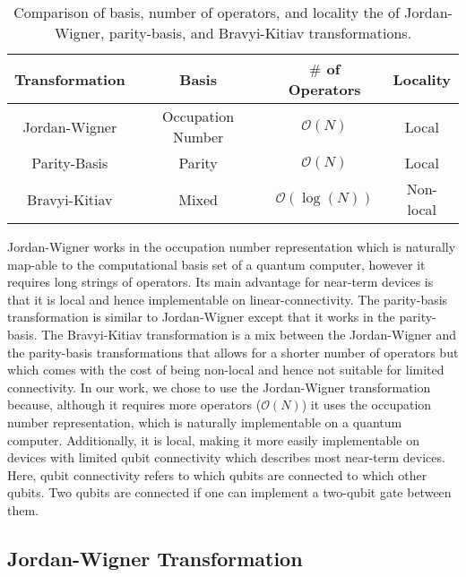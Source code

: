 \documentclass[10pt]{article}
\begin{document}
\begin{table}[h]
    \centering
    \begin{tabular}{c|c|c|c}
        Transformation & Basis & $\#$ of Operators & Locality \\
        \hline
        \hline
        Jordan-Wigner & Occupation Number & $\mathcal{O}(N)$ & Local \\
        \hline
        Parity-Basis & Parity & $\mathcal{O}(N)$ & Local \\
        \hline
        Bravyi-Kitiav & Mixed & $\mathcal{O}(\log(N))$ & Non-local
    \end{tabular}
    \caption{Comparison of basis, number of operators, and locality the of Jordan-Wigner, parity-basis, and Bravyi-Kitiav transformations.}
    \label{tab:transformation_comp}
\end{table}

Jordan-Wigner works in the occupation number representation which is naturally map-able to the computational basis set of a quantum computer, however it requires long strings of operators. Its main advantage for near-term devices is that it is local and hence implementable on linear-connectivity. The parity-basis transformation is similar to Jordan-Wigner except that it works in the parity-basis. The Bravyi-Kitiav transformation is a mix between the Jordan-Wigner and the parity-basis transformations that allows for a shorter number of operators but which comes with the cost of being non-local and hence not suitable for limited connectivity. In our work, we chose to use the Jordan-Wigner transformation because, although it requires more operators ($\mathcal{O}(N)$) it uses the occupation number representation, which is naturally implementable on a quantum computer. Additionally, it is local, making it more easily implementable on devices with limited qubit connectivity which describes most near-term devices. Here, qubit connectivity refers to which qubits are connected to which other qubits. Two qubits are connected if one can implement a two-qubit gate between them.

\subsection{Jordan-Wigner Transformation}
\end{document}
